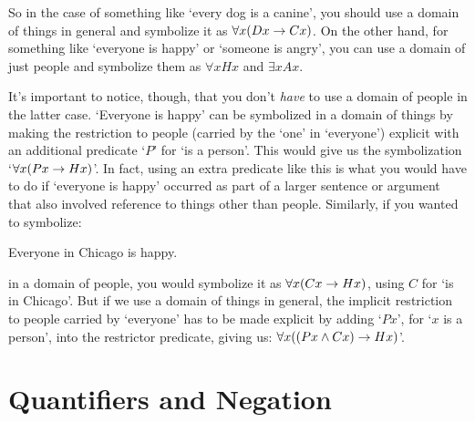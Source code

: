 So in the case of something like `every dog is a canine', you should use a domain of things in general and symbolize it as $\forall x(Dx \rightarrow Cx)$.  On the other hand, for something like `everyone is happy' or `someone is angry', you can use a domain of just people and symbolize them as $\forall xHx$ and $\exists xAx$.

It's important to notice, though, that you don't \emph{have} to use a domain of people in the latter case. `Everyone is happy' can be symbolized in a domain of things by making the restriction to people (carried by the `one' in `everyone') explicit with an additional predicate `$P$' for `\blank is a person'. This would give us the symbolization `$\forall x(Px \rightarrow Hx)$'.  In fact, using an extra predicate like this is what you would have to do if `everyone is happy' occurred as part of a larger sentence or argument that also involved reference to things other than people.   Similarly, if you wanted to symbolize:
\begin{earg}
	\item[\ex{quan5}] Everyone in Chicago is happy.
\end{earg}
in a domain of people, you would symbolize it as $\forall x(Cx \rightarrow Hx)$, using $C$ for `\blank is in Chicago'.  But if we use a domain of things in general, the implicit restriction to people carried by `everyone' has to be made explicit by adding `$Px$', for `$x$ is a person', into the restrictor predicate, giving us:  $\forall x((Px \wedge Cx) \rightarrow Hx)$'.


\section{Quantifiers and Negation}




